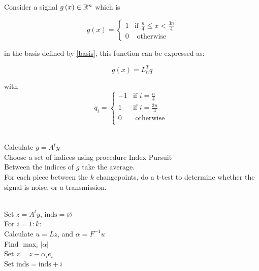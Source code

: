 \begin{example}
\label{ex:single-rect}
Consider a signal \(g\left(x\right) \in {\mathbb{R}}^n\) which is 

\begin{equation}
g\left(x\right) =
\begin{cases}
1 & \text{if } \frac{n}{4} \leq x < \frac{3n}{4} \\
0 & \text{ otherwise } 
\end{cases}
\end{equation}

in the basis defined by \eqref{basis}, this function can be expressed as:

\begin{equation}
g\left(x\right) = L_n^Tq
\end{equation}

with 
\begin{equation}
q_i =
\begin{cases}
-1 & \text{if } i = \frac{n}{4} \\
1 & \text{if } i = \frac{3n}{4} \\
0 & \text{ otherwise } \\
\end{cases}
\end{equation}

\end{example}

\begin{algorithmic}[1]
 \\
Calculate \(g=A^ty\)
 \\
Choose a set of indices using procedure Index Pursuit
\\
 Between the indices of \(g\) take the average.
 \\
   	For each piece between the \(k\) changepoints, do a t-test to determine whether the signal is noise, or a transmission.
   	\EndProcedure
\end{algorithmic}


\begin{algorithmic}[1]
 \\
 Set \(z = A^ty\), \(\mathrm{inds} = \varnothing \)
 \\ For \(i=1:k\):
 \\ Calculate \(u = Lz\), and \(\alpha = F^{-1}u\)
 \\ Find \(\max_i|\alpha|\)
 \\ Set \(z = z - \alpha_i e_i\)
 \\ Set \(\mathrm{inds} = \mathrm{inds}+i\)
 \EndProcedure
\end{algorithmic}


